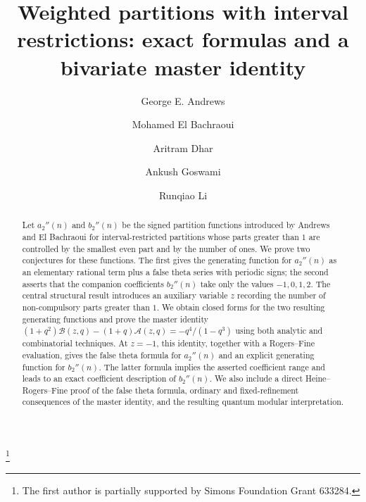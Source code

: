 \documentclass[reqno]{amsart}
\title[Weighted partitions and a master identity]{Weighted partitions with interval restrictions: exact formulas and a bivariate master identity}
\theoremstyle{definition}
\theoremstyle{plain}
\theoremstyle{remark}
\numberwithin{equation}{section}
\begin{document}
\author[G. E. Andrews]{George E. Andrews}
\address{The Pennsylvania State University, University Park, Pennsylvania 16802, USA}

\author[M. El Bachraoui]{Mohamed El Bachraoui}
\address{Department of Mathematical Sciences,
United Arab Emirates University, PO Box 15551, Al-Ain, UAE}

\author[A. Dhar]{Aritram Dhar}
\address{Department of Mathematics, University of Florida, Gainesville, FL 32611, USA}

\author[A. Goswami]{Ankush Goswami}
\address{Department of Mathematics, University of Texas Rio Grande Valley, Edinburg, TX 78541, USA}

\author[R. Li]{Runqiao Li}
\address{Department of Mathematics, University of Texas Rio Grande Valley, Edinburg, TX 78541, USA}
%
\begin{abstract}
Let $a_2''(n)$ and $b_2''(n)$ be the signed partition functions introduced by Andrews and El Bachraoui for interval-restricted partitions whose parts greater than $1$ are controlled by the smallest even part and by the number of ones.  We prove two conjectures for these functions.  The first gives the generating function for $a_2''(n)$ as an elementary rational term plus a false theta series with periodic signs; the second asserts that the companion coefficients $b_2''(n)$ take only the values $-1,0,1,2$.  The central structural result introduces an auxiliary variable $z$ recording the number of non-compulsory parts greater than $1$.  We obtain closed forms for the two resulting generating functions and prove the master identity $(1+q^2)\mathcal B(z,q)-(1+q)\mathcal A(z,q)=-q^4/(1-q^3)$ using both analytic and combinatorial techniques.  At $z=-1$, this identity, together with a Rogers--Fine evaluation, gives the false theta formula for $a_2''(n)$ and an explicit generating function for $b_2''(n)$.  The latter formula implies the asserted coefficient range and leads to an exact coefficient description of $b_2''(n)$.  We also include a direct Heine--Rogers--Fine proof of the false theta formula, ordinary and fixed-refinement consequences of the master identity, and the resulting quantum modular interpretation.
\end{abstract}
\date{}
\thanks{The first author is partially supported by Simons Foundation Grant 633284.}
\maketitle
%
\end{document}
